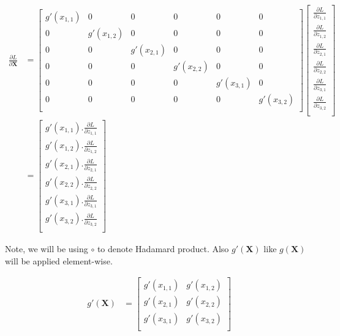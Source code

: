 \documentclass{article}
\newcommand{\matr}[1]{\mathbf{#1}} %
\begin{document}
\begin{align}
\frac{\partial L}{\partial \matr{X}} &=
\begin{bmatrix}
g'(x_{1,1}) & 0 & 0 & 0 & 0 & 0 \\[0.5em]
0 & g'(x_{1,2}) & 0 & 0 & 0 & 0 \\[0.5em]
0 & 0 & g'(x_{2,1}) & 0 & 0 & 0 \\[0.5em]
0 & 0 & 0 & g'(x_{2,2}) & 0 & 0 \\[0.5em]
0 & 0 & 0 & 0 & g'(x_{3,1}) & 0 \\[0.5em]
0 & 0 & 0 & 0 & 0 & g'(x_{3,2}) \\[0.5em]
\end{bmatrix}
\begin{bmatrix}
\frac{\partial L}{\partial z_{1,1}} \\[0.7em]
\frac{\partial L}{\partial z_{1,2}} \\[0.7em]
\frac{\partial L}{\partial z_{2,1}} \\[0.7em]
\frac{\partial L}{\partial z_{2,2}} \\[0.7em]
\frac{\partial L}{\partial z_{3,1}} \\[0.7em]
\frac{\partial L}{\partial z_{3,2}} \\[0.7em]
\end{bmatrix}
\nonumber \\
&=
\begin{bmatrix}
g'(x_{1,1}).\frac{\partial L}{\partial z_{1,1}} \\[0.7em]
g'(x_{1,2}).\frac{\partial L}{\partial z_{1,2}} \\[0.7em]
g'(x_{2,1}).\frac{\partial L}{\partial z_{2,1}} \\[0.7em]
g'(x_{2,2}).\frac{\partial L}{\partial z_{2,2}} \\[0.7em]
g'(x_{3,1}).\frac{\partial L}{\partial z_{3,1}} \\[0.7em]
g'(x_{3,2}).\frac{\partial L}{\partial z_{3,2}} \\[0.7em]
\end{bmatrix} \label{dXAsColumnVector_elewise_single_matrix}
\end{align}

Note, we will be using $\circ$ to denote Hadamard product. Also $g'(\matr{X})$ like $g(\matr{X})$ will be applied element-wise.

\begin{align}
g'(\matr{X}) &=
\begin{bmatrix}
g'(x_{1,1}) & g'(x_{1,2}) \\[0.5em]
g'(x_{2,1}) & g'(x_{2,2}) \\[0.5em]
g'(x_{3,1}) & g'(x_{3,2}) \\[0.5em]
\end{bmatrix} \nonumber
\end{align}
\end{document}
